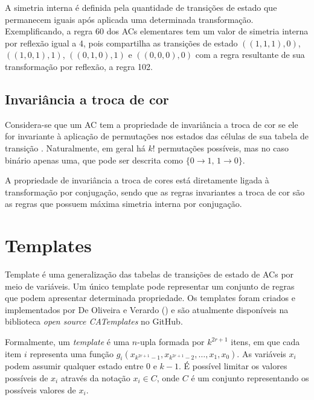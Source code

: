 \documentclass[12pt, a4paper]{article}
\begin{document}

A simetria interna é definida pela quantidade de transições de estado que permanecem iguais após aplicada uma determinada transformação. Exemplificando, a regra 60 dos ACs elementares tem um valor de simetria interna por reflexão igual a 4, pois compartilha as transições de estado $((1,1,1),0)$, $((1,0,1),1)$, $((0,1,0),1)$ e $ ((0,0,0),0)$ com a regra resultante de sua transformação por reflexão, a regra 102.

\subsection{Invariância a troca de cor}
Considera-se que um AC tem a propriedade de invariância a troca de cor se ele for invariante à aplicação de permutações nos estados das células de sua tabela de transição \cite{salo2013color}. Naturalmente, em geral há $k!$ permutações possíveis, mas no caso binário apenas uma, que pode ser descrita como $\{0 \to 1 ,\, 1 \to 0\}$. 

A propriedade de invariância a troca de cores está diretamente ligada à transformação por conjugação, sendo que as regras invariantes a troca de cor são as regras que possuem máxima simetria interna por conjugação.

\section{Templates}
\label{sec:templates}
Template é uma generalização das tabelas de transições de estado de ACs por meio de variáveis. Um único template pode representar um conjunto de regras que podem apresentar determinada propriedade. Os templates foram criados e implementados por De Oliveira e Verardo (\citeyear{deOliveira2014}) e são atualmente disponíveis na biblioteca \textit{open source CATemplates} \cite{CATemplates} no GitHub.

Formalmente, um \textit{template} é uma $n$-upla formada por $k^{2r+1}$ itens, em que cada item $i$ representa uma função $g_i(x_{k^{2r+1}-1},x_{k^{2r+1}-2},\dots,x_1,x_0)$. As variáveis $x_i$ podem assumir qualquer estado entre 0 e $k-1$. É possível limitar os valores possíveis de $x_i$ através da notação $x_i \in C$, onde $C$ é um conjunto representando os possíveis valores de $x_i$. %
\end{document}
